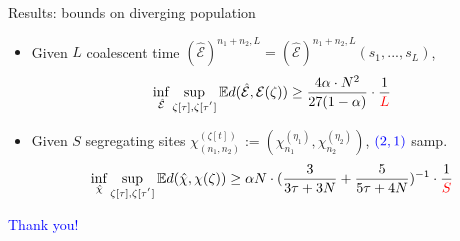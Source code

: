 \documentclass[handout]{beamer}
\begin{document}
\begin{frame}{Results: bounds on diverging population}
\begin{itemize}
\item Given $L$ coalescent time $(\hat{\mathcal{E}})^{n_{1}+n_{2},L} =(\hat{\mathcal{E}})^{n_{1}+n_{2},L} (s_{1},...,s_{L})$, $$\inf_{\hat{\mathcal{E}}} \sup_{\zeta[\tau],\zeta[\tau^{'}]} \mathbb{E}d(\hat{\mathcal{E}},\mathcal{E}(\zeta)) \geq\frac{4\alpha\cdot N^{2}}{27(1-\alpha)}\cdot \frac{1}{\textcolor{red}{L}}$$
\item Given $S$ segregating sites $\chi_{(n_{1},n_{2})}^{(\zeta[t])}:=(\chi_{n_{1}}^{(\eta_{1})},\chi_{n_{2}}^{(\eta_{2})})$, $\textcolor{blue}{(2,1)}$ samp.
$$\inf_{\hat{\chi}} \sup_{\zeta[\tau],\zeta[\tau^{'}]} \mathbb{E}d(\hat{\chi},\chi(\zeta))  \geq\alpha N\cdot (\frac{3}{3\tau+3N}+\frac{5}{5\tau+4N})^{-1}\cdot \frac{1}{\textcolor{red}{S}}$$
\end{itemize}
\end{frame}
\begin{frame}
\begin{center}
\textcolor{blue}{\Large{Thank you!}}
\end{center}
\end{frame}
\end{document}
